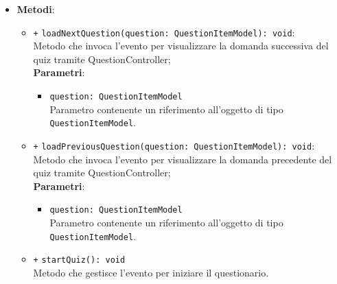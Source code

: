 \begin{itemize}
\begin{itemize}
\begin{itemize}
			\end{itemize}	
		\end{itemize}
		\item \textbf{Metodi}: 
		\begin{itemize}
			\item \texttt{+} \texttt{loadNextQuestion(question: QuestionItemModel): void}: \\ Metodo che invoca l'evento per visualizzare la domanda successiva del quiz tramite QuestionController; \\
			\textbf{Parametri}:
			\begin{itemize}
				\item \texttt{question: QuestionItemModel} \\
				Parametro contenente un riferimento all'oggetto di tipo \texttt{QuestionItemModel}.
			\end{itemize}
			\item \texttt{+} \texttt{loadPreviousQuestion(question: QuestionItemModel): void}: \\ Metodo che invoca l'evento per visualizzare la domanda precedente del quiz tramite QuestionController; \\
			\textbf{Parametri}:
			\begin{itemize}
				\item \texttt{question: QuestionItemModel} \\
				Parametro contenente un riferimento all'oggetto di tipo \texttt{QuestionItemModel}.
			\end{itemize}
			\item \texttt{+} \texttt{startQuiz(): void} \\
			Metodo che gestisce l'evento per iniziare il questionario. 
		\end{itemize}
	\end{itemize}
	
	